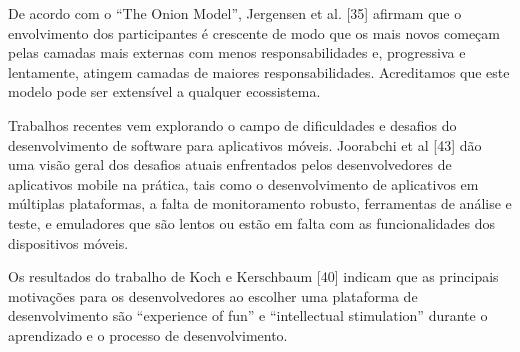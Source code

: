 \documentclass[conference]{IEEEtran}
\begin{document}
De acordo com o “The Onion Model”, Jergensen et al. [35] afirmam que o envolvimento dos participantes é crescente de modo que os mais novos começam pelas camadas mais externas com menos responsabilidades e, progressiva e lentamente, atingem camadas de maiores responsabilidades. Acreditamos que este modelo pode ser extensível a qualquer ecossistema.

Trabalhos recentes vem explorando o campo de dificuldades e desafios do desenvolvimento de software para aplicativos móveis. Joorabchi et al [43] dão uma visão geral dos desafios atuais enfrentados pelos desenvolvedores de aplicativos mobile na prática, tais como o desenvolvimento de aplicativos em múltiplas plataformas, a falta de monitoramento robusto, ferramentas de análise e teste, e emuladores que são lentos ou estão em falta com as funcionalidades dos dispositivos móveis.

Os resultados do trabalho de Koch e Kerschbaum [40] indicam que as principais motivações para os desenvolvedores ao escolher uma plataforma de desenvolvimento são “experience of fun” e “intellectual stimulation” durante o aprendizado e o processo de desenvolvimento. 



%
%
%



\end{document}
